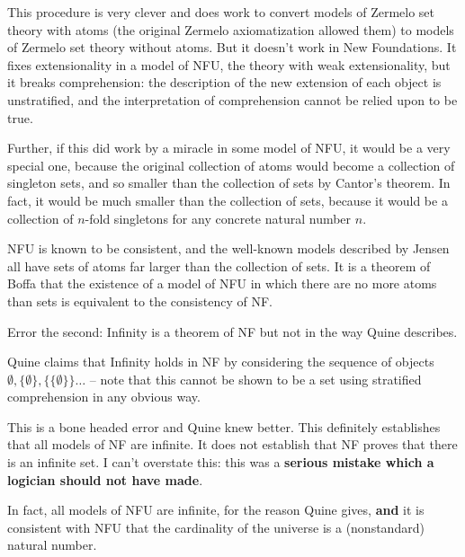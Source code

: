 \documentclass[12pt]{slides}
\begin{document}
\begin{slide}

This procedure is very clever and does work to convert models of Zermelo set theory with atoms (the original Zermelo axiomatization allowed them) to models of Zermelo set theory without atoms.  But it doesn't work in New Foundations.  It fixes extensionality in a model of NFU, the theory with weak extensionality, but it breaks comprehension:  the description of the new extension of each object is unstratified, and the interpretation of comprehension cannot be relied upon to be true.

Further, if this did work by a miracle in some model of NFU, it would be a very special one, because the original collection of atoms would become a collection of singleton sets, and so smaller than the collection of sets by Cantor's theorem.  In fact, it would be much smaller than the collection of sets, because it would be a collection of $n$-fold singletons for any concrete natural number $n$.

\end{slide}

\begin{slide}

NFU is known to be consistent, and the well-known models described by Jensen all have sets of atoms far larger than the collection of sets.  It is a theorem of Boffa that the existence of a model of NFU in which there are no more atoms than sets is equivalent to the consistency of NF.


\end{slide}

\begin{slide}

{\Large Error the second:  Infinity is a theorem of NF but not in the way Quine describes.}

Quine claims that Infinity holds in NF by considering the sequence of objects $\emptyset, \{\emptyset\}, \{\{\emptyset\}\}\ldots$ -- note that this cannot be shown to be a set using stratified comprehension in any obvious way.

This is a bone headed error and Quine knew better.  This definitely establishes that all models of NF are infinite.  It does not establish that NF proves
that there is an infinite set.  I can't overstate this:  this was a {\bf serious mistake which a logician should not have made}.

In fact, all models of NFU are infinite, for the reason Quine gives, {\bf and} it is consistent with NFU that the cardinality of the universe is a (nonstandard) natural number.

\end{slide}
\end{document}
